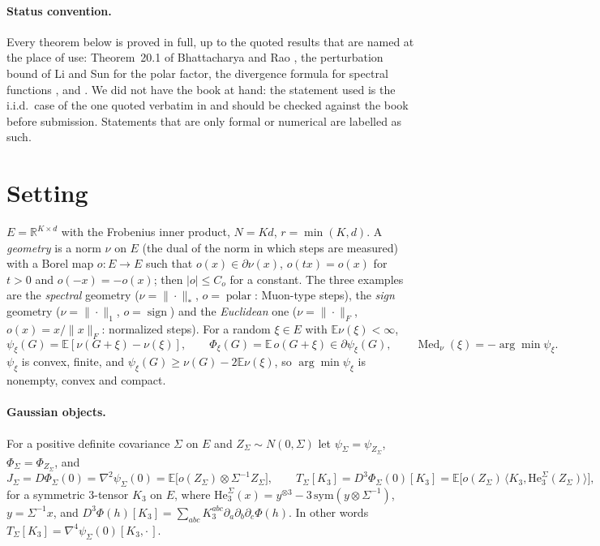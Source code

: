 \documentclass[10pt]{article}
\theoremstyle{definition}
\theoremstyle{remark}
\newcommand{\R}{\mathbb{R}}
\newcommand{\E}{\mathbb{E}}
\newcommand{\nnuc}[1]{\|#1\|_{*}}
\newcommand{\nF}[1]{\|#1\|_{F}}
\newcommand{\inner}[2]{\langle #1, #2\rangle}
\newcommand{\polar}{\operatorname{polar}}
\newcommand{\Med}{\operatorname{Med}}
\newcommand{\He}{\mathrm{He}}
\begin{document}
\paragraph{Status convention.} Every theorem below is proved in full, up to the quoted results that are named at the
place of use: Theorem~20.1 of Bhattacharya and Rao \cite{br}, the perturbation bound of Li and Sun \cite{lisun} for the
polar factor, the divergence formula for spectral functions \cite{candes}, and \cite[Theorem~2]{manuscript}. We did not
have the book \cite{br} at hand: the statement used is the i.i.d.\ case of the one quoted verbatim in
\cite[Theorem~4.1]{angstpoly} and should be checked against the book before submission. Statements that are only
formal or numerical are labelled as such.

\section{Setting}\label{sec:setting}

$E=\R^{K\times d}$ with the Frobenius inner product, $N=Kd$, $r=\min(K,d)$. A \emph{geometry} is a norm $\nu$ on $E$
(the dual of the norm in which steps are measured) with a Borel map $o:E\to E$ such that $o(x)\in\partial\nu(x)$,
$o(tx)=o(x)$ for $t>0$ and $o(-x)=-o(x)$; then $|o|\le C_o$ for a constant. The three examples are the \emph{spectral}
geometry ($\nu=\nnuc\cdot$, $o=\polar$: Muon-type steps), the \emph{sign} geometry ($\nu=\|\cdot\|_1$, $o=\operatorname{sign}$)
and the \emph{Euclidean} one ($\nu=\nF\cdot$, $o(x)=x/\nF x$: normalized steps). For a random $\xi\in E$ with
$\E\nu(\xi)<\infty$,
\[
\psi_\xi(G)=\E[\nu(G+\xi)-\nu(\xi)],\qquad \Phi_\xi(G)=\E\,o(G+\xi)\in\partial\psi_\xi(G),\qquad
\Med_\nu(\xi)=-\arg\min\psi_\xi .
\]
$\psi_\xi$ is convex, finite, and $\psi_\xi(G)\ge\nu(G)-2\E\nu(\xi)$, so $\arg\min\psi_\xi$ is nonempty, convex and compact.

\paragraph{Gaussian objects.} For a positive definite covariance $\Sigma$ on $E$ and $Z_\Sigma\sim N(0,\Sigma)$ let
$\psi_\Sigma=\psi_{Z_\Sigma}$, $\Phi_\Sigma=\Phi_{Z_\Sigma}$, and
\begin{equation}\label{eq:JT}
J_\Sigma=D\Phi_\Sigma(0)=\nabla^2\psi_\Sigma(0)=\E\big[o(Z_\Sigma)\otimes\Sigma^{-1}Z_\Sigma\big],\qquad
T_\Sigma[K_3]=D^3\Phi_\Sigma(0)[K_3]=\E\big[o(Z_\Sigma)\,\inner{K_3}{\He_3^\Sigma(Z_\Sigma)}\big],
\end{equation}
for a symmetric $3$-tensor $K_3$ on $E$, where $\He_3^\Sigma(x)=y^{\otimes3}-3\,\mathrm{sym}(y\otimes\Sigma^{-1})$,
$y=\Sigma^{-1}x$, and $D^3\Phi(h)[K_3]=\sum_{abc}K_3^{abc}\partial_a\partial_b\partial_c\Phi(h)$. In other words
$T_\Sigma[K_3]=\nabla^4\psi_\Sigma(0)[K_3,\cdot\,]$.
\end{document}
